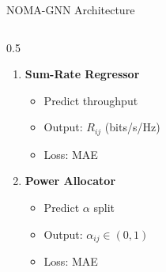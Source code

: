 \documentclass[aspectratio=169]{beamer}
\begin{document}
\begin{frame}{NOMA-GNN Architecture}
\begin{columns}
\begin{column}{0.5\textwidth}
\begin{enumerate}
                \item \textbf{Sum-Rate Regressor}
                \begin{itemize}
                    \item Predict throughput
                    \item Output: $R_{ij}$ (bits/s/Hz)
                    \item Loss: MAE
                \end{itemize}
                
                \item \textbf{Power Allocator}
                \begin{itemize}
                    \item Predict $\alpha$ split
                    \item Output: $\alpha_{ij} \in (0,1)$
                    \item Loss: MAE
                \end{itemize}
            \end{enumerate}
        \end{column}
    \end{columns}
\end{frame}
\end{document}
